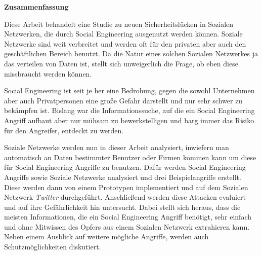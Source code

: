 
\clearemptydoublepage
{}
{}


\vspace*{2cm}
\begin{center}
{\Large \bf Zusammenfassung}
\end{center}
\vspace{1cm}

Diese Arbeit behandelt eine Studie zu neuen Sicherheitslücken in Sozialen
Netzwerken, die durch Social Engineering ausgenutzt werden können. Soziale
Netzwerke sind weit verbreitet und werden oft für den privaten aber auch den
geschäftlichen Bereich benutzt. Da die Natur eines solchen Sozialen Netzwerkes
ja das verteilen von Daten ist, stellt sich unweigerlich die Frage, ob eben
diese missbraucht werden können.

Social Engineering ist seit je her eine Bedrohung, gegen die sowohl Unternehmen
aber auch Privatpersonen eine große Gefahr darstellt und nur sehr schwer zu
bekämpfen ist. Bislang war die Informationssuche, auf die ein Social
Engineering Angriff aufbaut aber nur mühsam zu bewerkstelligen und barg immer
das Risiko für den Angreifer, entdeckt zu werden.

Soziale Netzwerke werden nun in dieser Arbeit analysiert, inwiefern man
automatisch an Daten bestimmter Benutzer oder Firmen kommen kann um diese für
Social Engineering Angriffe zu benutzen. Dafür werden Social Engineering
Angriffe sowie Soziale Netzwerke analysiert und drei Beispielangriffe erstellt.
Diese werden dann von einem Prototypen implementiert und auf dem Sozialen
Netzwerk \textit{Twitter} durchgeführt. Anschließend werden diese Attacken
evaluiert und auf ihre Gefährlichkeit hin untersucht. Dabei stellt sich heraus,
dass die meisten Informationen, die ein Social Engineering Angriff benötigt,
sehr einfach und ohne Mitwissen des Opfers aus einem Sozialen Netzwerk
extrahieren kann. Neben einem Ausblick auf weitere mögliche Angriffe, werden
auch Schutzmöglichkeiten diskutiert.

